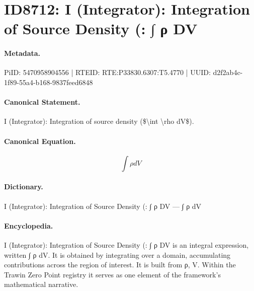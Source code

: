 \section*{ID8712: I (Integrator): Integration of Source Density (: ∫ ρ DV}
\paragraph{Metadata.}
PiID: 5470958904556 | RTEID: RTE:P33830.6307:T5.4770 | UUID: d2f2ab4c-1f89-55a4-b168-9837feed6848

\paragraph{Canonical Statement.}
I (Integrator): Integration of source density (\$\textbackslash{}int \textbackslash{}rho dV\$).

\paragraph{Canonical Equation.}
\[
\int \rho dV
\]

\paragraph{Dictionary.}
I (Integrator): Integration of Source Density (: ∫ ρ DV — ∫ ρ dV

\paragraph{Encyclopedia.}
I (Integrator): Integration of Source Density (: ∫ ρ DV is an integral expression, written ∫ ρ dV. It is obtained by integrating over a domain, accumulating contributions across the region of interest. It is built from ρ, V. Within the Trawin Zero Point registry it serves as one element of the framework's mathematical narrative.
